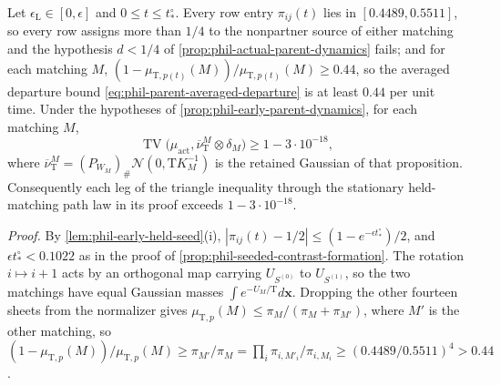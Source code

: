 Let \(\epsilon_{\mathrm L}\in[0,\epsilon]\) and \(0\le t\le t^\circ_*\).
Every row entry \(\pi_{ij}(t)\) lies in \([0.4489,0.5511]\), so every row
assigns more than \(1/4\) to the nonpartner source of either matching and the
hypothesis \(d<1/4\) of \cref{prop:phil-actual-parent-dynamics} fails; and for
each matching \(M\),
\((1-\mu_{\mathrm T,p(t)}(M))/\mu_{\mathrm T,p(t)}(M)\ge0.44\), so the averaged
departure bound \cref{eq:phil-parent-averaged-departure} is at least
\(0.44\) per unit time. Under the hypotheses of
\cref{prop:phil-early-parent-dynamics}, for each matching \(M\),
\[
 \operatorname{TV}\bigl(\mu_{\mathrm{act}},
   \overline\nu^M_{\mathrm T}\otimes\delta_M\bigr)\ge1-3\cdot10^{-18},
\]
where \(\overline\nu^M_{\mathrm T}=(P_{W_M})_\#\mathcal N(0,\mathrm TK_M^{-1})\)
is the retained Gaussian of that proposition. Consequently each leg of the
triangle inequality through the stationary held-matching path law in its proof
exceeds \(1-3\cdot10^{-18}\).

\noindent\emph{Proof.}
By \cref{lem:phil-early-held-seed}(i),
\(|\pi_{ij}(t)-1/2|\le(1-e^{-\epsilon t^\circ_*})/2\), and
\(\epsilon t^\circ_*<0.1022\) as in the proof of
\cref{prop:phil-seeded-contrast-formation}. The rotation \(i\mapsto i+1\) acts
by an orthogonal map carrying \(U_{S^{(0)}}\) to \(U_{S^{(1)}}\), so the two
matchings have equal Gaussian masses \(\int e^{-U_M/\mathrm T}d\mathbf x\).
Dropping the other fourteen sheets from the normalizer gives
\(\mu_{\mathrm T,p}(M)\le\pi_M/(\pi_M+\pi_{M'})\), where \(M'\) is the other
matching, so
\((1-\mu_{\mathrm T,p}(M))/\mu_{\mathrm T,p}(M)\ge\pi_{M'}/\pi_M
=\prod_i\pi_{i,M'_i}/\pi_{i,M_i}\ge(0.4489/0.5511)^4>0.44\).

